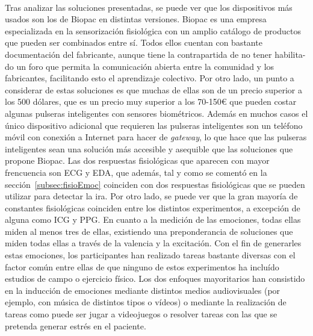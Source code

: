 \paragraph{}
Tras analizar las soluciones presentadas, se puede ver que los dispositivos más usados son los de Biopac en distintas versiones. Biopac es una empresa especializada en la sensorización fisiológica con un amplio catálogo de productos que pueden ser combinados entre sí. Todos ellos cuentan con bastante documentación del fabricante, aunque tiene la contrapartida de no tener habilita-\\do un foro que permita la comunicación abierta entre la comunidad y los fabricantes, facilitando esto el aprendizaje colectivo. Por otro lado, un punto a considerar de estas soluciones es que muchas de ellas son de un precio superior a los 500 dólares, que es un precio muy superior a los 70-150€ que pueden costar algunas pulseras inteligentes con sensores biométricos. Además en muchos casos el único dispositivo adicional que requieren las pulseras inteligentes son un teléfono móvil con conexión a Internet para hacer de \textit{gateway}, lo que hace que las pulseras inteligentes sean una solución más accesible y asequible que las soluciones que propone Biopac. Las dos respuestas fisiológicas que aparecen con mayor frencuencia son ECG y EDA, que además, tal y como se comentó en la sección~\ref{subsec:fisioEmoc} coinciden con dos respuestas fisiológicas que se pueden utilizar para detectar la ira. Por otro lado, se puede ver que la gran mayoría de constantes fisiológicas coinciden entre los distintos experimentos, a excepción de alguna como ICG y PPG. En cuanto a la medición de las emociones, todas ellas miden al menos tres de ellas, existiendo una preponderancia de soluciones que miden todas ellas a través de la valencia y la excitación. Con el fin de generarles estas emociones, los participantes han realizado tareas bastante diversas con el factor común entre ellas de que ninguno de estos experimentos ha incluído estudios de campo o ejercicio físico. Los dos enfoques mayoritarios han consistido en la inducción de emociones mediante distintos medios audiovisuales (por ejemplo, con música de distintos tipos o vídeos) o mediante la realización de tareas como puede ser jugar a videojuegos o resolver tareas con las que se pretenda generar estrés en el paciente.

